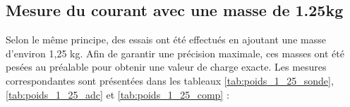 \subsection{Mesure du courant avec une masse de 1.25kg}
Selon le même principe, des essais ont été effectués en ajoutant une masse d'environ 1,25 kg. Afin de garantir une précision maximale, ces masses ont été pesées au préalable pour obtenir une valeur de charge exacte. Les mesures correspondantes sont présentées dans les tableaux \ref{tab:poids_1_25_sonde}, \ref{tab:poids_1_25_adc} et \ref{tab:poids_1_25_comp} :

\begin{table}[H]
    \centering
\end{table}
